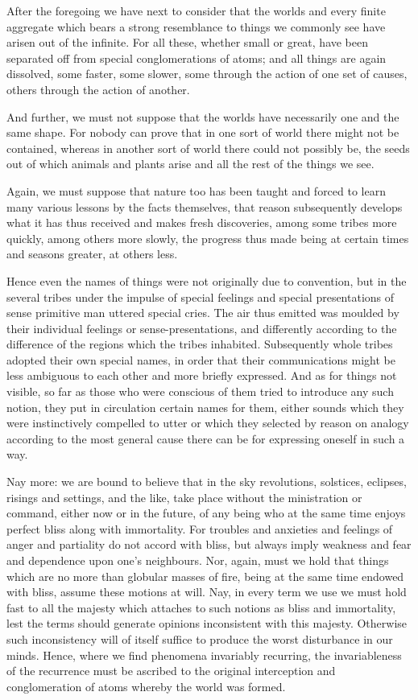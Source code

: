 \documentclass{stex}
\begin{document}
After the foregoing we have next to consider that the worlds and every finite aggregate which bears a strong resemblance to things we commonly see have arisen out of the infinite.
For all these, whether small or great, have been separated off from special conglomerations of atoms; and all things are again dissolved, some faster, some slower, some through the action of one set of causes, others through the action of another.

And further, we must not suppose that the worlds have necessarily one and the same shape.
For nobody can prove that in one sort of world there might not be contained, whereas in another sort of world there could not possibly be, the seeds out of which animals and plants arise and all the rest of the things we see.

Again, we must suppose that nature too has been taught and forced to learn many various lessons by the facts themselves, that reason subsequently develops what it has thus received and makes fresh discoveries, among some tribes more quickly, among others more slowly, the progress thus made being at certain times and seasons greater, at others less.

Hence even the names of things were not originally due to convention, but in the several tribes under the impulse of special feelings and special presentations of sense primitive man uttered special cries.
The air thus emitted was moulded by their individual feelings or sense-presentations, and differently according to the difference of the regions which the tribes inhabited.
Subsequently whole tribes adopted their own special names, in order that their communications might be less ambiguous to each other and more briefly expressed.
And as for things not visible, so far as those who were conscious of them tried to introduce any such notion, they put in circulation certain names for them, either sounds which they were instinctively compelled to utter or which they selected by reason on analogy according to the most general cause there can be for expressing oneself in such a way.

Nay more: we are bound to believe that in the sky revolutions, solstices, eclipses, risings and settings, and the like, take place without the ministration or command, either now or in the future, of any being who at the same time enjoys perfect bliss along with immortality.
For troubles and anxieties and feelings of anger and partiality do not accord with bliss, but always imply weakness and fear and dependence upon one's neighbours.
Nor, again, must we hold that things which are no more than globular masses of fire, being at the same time endowed with bliss, assume these motions at will.
Nay, in every term we use we must hold fast to all the majesty which attaches to such notions as bliss and immortality, lest the terms should generate opinions inconsistent with this majesty.
Otherwise such inconsistency will of itself suffice to produce the worst disturbance in our minds.
Hence, where we find phenomena invariably recurring, the invariableness of the recurrence must be ascribed to the original interception and conglomeration of atoms whereby the world was formed.
\end{document}
